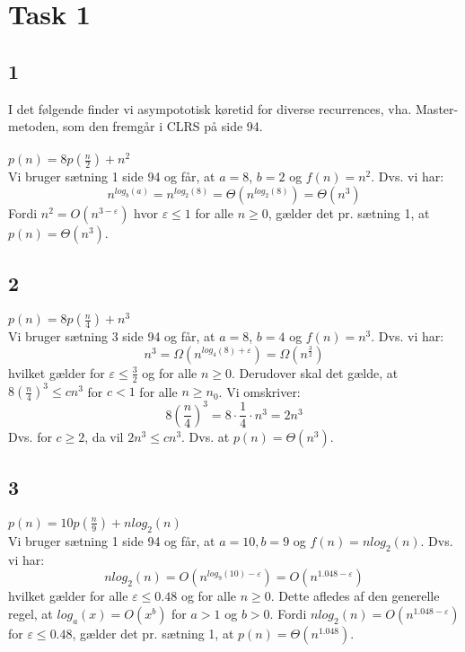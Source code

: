 \section{Task 1}

\subsection{1}

I det følgende finder vi asympototisk køretid for diverse recurrences,
vha. Master-metoden, som den fremgår i CLRS på side 94.\\\\ 
$p(n) = 8p(\frac{n}{2}) + n^2$\\
Vi bruger sætning 1 side 94 og får, at $a = 8$, $b = 2$ og $f(n) = n^2$.
Dvs. vi har:
$$n^{log_b(a)} = n^{log_2(8)} = \Theta(n^{log_2(8)}) = \Theta(n^3)$$
Fordi $n^2 = O(n^{3-\varepsilon})$ hvor $\varepsilon \leq 1$ for alle $n \geq 0$, gælder det pr. sætning 1, at $p(n) = \Theta(n^3)$.

\subsection{2}

$p(n) = 8p(\frac{n}{4}) + n^3$\\
Vi bruger sætning 3 side 94 og får, at $a = 8$, $b = 4$ og $f(n) = n^3$.
Dvs. vi har:
$$n^3 = \Omega(n^{log_4(8)+\varepsilon}) = \Omega(n^{\frac{3}{2}})$$
hvilket gælder for $\varepsilon \leq \frac{3}{2}$ og for alle $n \geq 0$.
Derudover skal det gælde, at $8(\frac{n}{4})^3 \leq cn^3$ for $c < 1$ for alle $n \geq n_0$. Vi omskriver:
$$8(\frac{n}{4})^3 = 8 \cdot \frac{1}{4} \cdot n^3 = 2n^3$$
Dvs. for $c \geq 2$, da vil $2n^3 \leq cn^3$.
Dvs. at $p(n) = \Theta(n^3)$.

\subsection{3}

$p(n) = 10p(\frac{n}{9}) + nlog_2(n)$\\
Vi bruger sætning 1 side 94 og får, at $a = 10, b = 9$ og $f(n) = nlog_2(n)$.
Dvs. vi har:
$$nlog_2(n) = O(n^{log_9(10)-\varepsilon}) = O(n^{1.048 - \varepsilon})$$
hvilket gælder for alle $\varepsilon \leq 0.48$ og for alle $n \geq 0$.
Dette afledes af den generelle regel, at $log_a(x) = O(x^b)$ for $a > 1$ og $b > 0$.
Fordi $nlog_2(n) = O(n^{1.048 - \varepsilon})$ for $\varepsilon \leq 0.48$, gælder det pr. sætning 1, at $p(n) = \Theta(n^{1.048})$.

